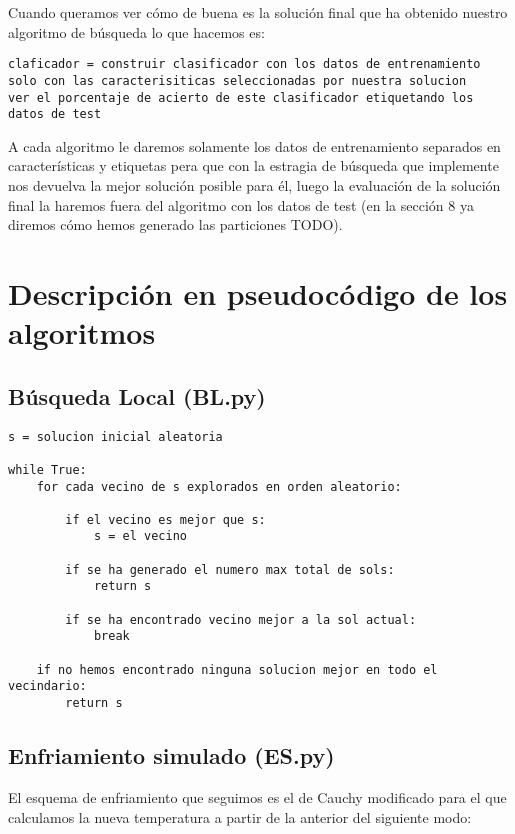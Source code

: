 \documentclass[10pt,a4paper]{article}
\begin{document}
Cuando queramos ver cómo de buena es la solución final que ha obtenido nuestro algoritmo de búsqueda lo que hacemos es:\\

\begin{lstlisting}
claficador = construir clasificador con los datos de entrenamiento solo con las caracterisiticas seleccionadas por nuestra solucion
ver el porcentaje de acierto de este clasificador etiquetando los datos de test
\end{lstlisting}

A cada algoritmo le daremos solamente los datos de entrenamiento separados en características y etiquetas pera que con la estragia de búsqueda que implemente nos devuelva la mejor solución posible para él, luego la evaluación de la solución final la haremos fuera del algoritmo con los datos de test (en la sección 8 ya diremos cómo hemos generado las particiones TODO).
\newpage
\section{\color[rgb]{0.0,0.0,0.21}Descripción en pseudocódigo de los algoritmos}
\subsection{\color[rgb]{0.0,0.0,0.51}Búsqueda Local (BL.py)}

\begin{lstlisting}
s = solucion inicial aleatoria

while True:
	for cada vecino de s explorados en orden aleatorio:
	
		if el vecino es mejor que s:
			s = el vecino
		
		if se ha generado el numero max total de sols:
			return s
			
		if se ha encontrado vecino mejor a la sol actual:
			break
			
	if no hemos encontrado ninguna solucion mejor en todo el vecindario:
		return s
\end{lstlisting}

\newpage
\subsection{\color[rgb]{0.0,0.0,0.51}Enfriamiento simulado (ES.py)}

El esquema de enfriamiento que seguimos es el de Cauchy modificado para el que calculamos la nueva temperatura a partir de la anterior del siguiente modo:\\
\end{document}
